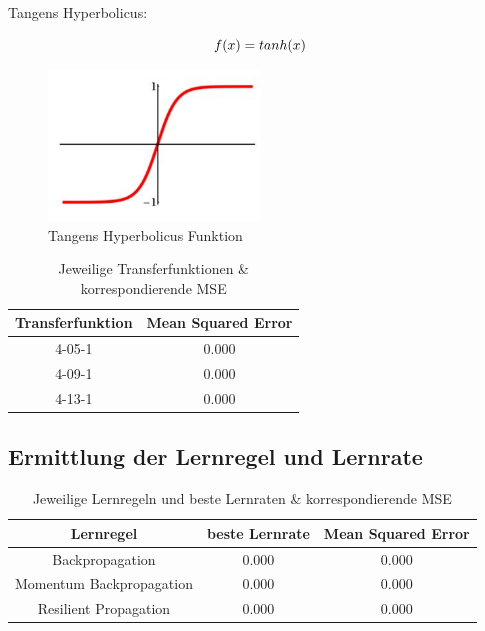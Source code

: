 \documentclass[a4paper,DIV11,bibliography=totoc,headings=normal,ngerman,headsepline,listof=totoc,parskip=half]{scrreprt}
\newcommand*{\formelentry}[1]{\addcontentsline{for}{formel}{\protect\numberline{Formel~\theequation} #1}}
\begin{document}
Tangens Hyperbolicus:

\begin{equation}\formelentry{Tanh Funktion}
f(x)= tanh(x)
\end{equation}

\begin{figure}[htbp]
\centering
		\includegraphics[width=0.5\textwidth]{tanh.PNG}
	\caption{Tangens Hyperbolicus Funktion}
	\label{fig:Tangens Hyperbolicus Funktion}
\end{figure}

\begin{table}
  \centering
  \begin{tabular}{|c|c|}
  \hline 
  \rule[0ex]{0pt}{2.5ex} Transferfunktion & Mean Squared Error \\ 
  \hline 
  \rule[0ex]{0pt}{2.5ex} 4-05-1 & 0.000 \\ 
  \hline 
  \rule[0ex]{0pt}{2.5ex} 4-09-1 & 0.000 \\ 
  \hline 
  \rule[0ex]{0pt}{2.5ex} 4-13-1 & 0.000 \\ 
  \hline 
  \end{tabular} 
  \caption{Jeweilige Transferfunktionen \& korrespondierende MSE}
  \label{tab:tab2}
\end{table}

\subsection{Ermittlung der Lernregel und Lernrate} %

\begin{table}[H]
  \centering
  \begin{tabular}{|c|c|c|}
  \hline 
  \rule[0ex]{0pt}{2.5ex} Lernregel & beste Lernrate & Mean Squared Error \\ 
  \hline 
  \rule[0ex]{0pt}{2.5ex} Backpropagation & 0.000 & 0.000 \\ 
  \hline 
  \rule[0ex]{0pt}{2.5ex} Momentum Backpropagation & 0.000 & 0.000\\ 
  \hline 
  \rule[0ex]{0pt}{2.5ex} Resilient Propagation & 0.000 & 0.000 \\ 
  \hline 
  \end{tabular} 
  \caption{Jeweilige Lernregeln und beste Lernraten \& korrespondierende MSE}
  \label{tab:tab3}
\end{table}
\end{document}
